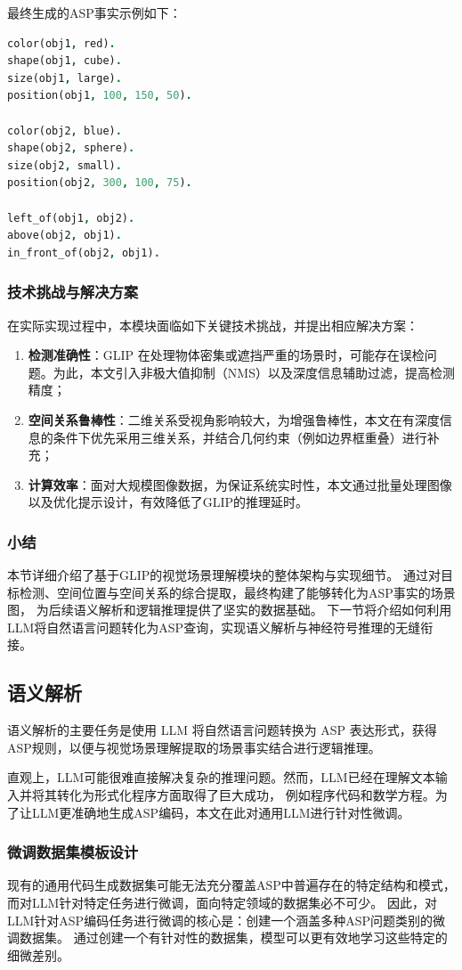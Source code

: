最终生成的ASP事实示例如下： 
\begin{lstlisting}[language=Prolog] 
color(obj1, red). 
shape(obj1, cube). 
size(obj1, large). 
position(obj1, 100, 150, 50).

color(obj2, blue). 
shape(obj2, sphere). 
size(obj2, small). 
position(obj2, 300, 100, 75).

left_of(obj1, obj2). 
above(obj2, obj1). 
in_front_of(obj2, obj1). 
\end{lstlisting}
\subsubsection{技术挑战与解决方案}
在实际实现过程中，本模块面临如下关键技术挑战，并提出相应解决方案： 
\begin{enumerate}[label=(\arabic*),itemsep=0.5em] 
    \item \textbf{检测准确性}：GLIP 在处理物体密集或遮挡严重的场景时，可能存在误检问题。为此，本文引入非极大值抑制（NMS）以及深度信息辅助过滤，提高检测精度； 
    \item \textbf{空间关系鲁棒性}：二维关系受视角影响较大，为增强鲁棒性，本文在有深度信息的条件下优先采用三维关系，并结合几何约束（例如边界框重叠）进行补充； 
    \item \textbf{计算效率}：面对大规模图像数据，为保证系统实时性，本文通过批量处理图像以及优化提示设计，有效降低了GLIP的推理延时。
\end{enumerate}
\subsubsection{小结}
本节详细介绍了基于GLIP的视觉场景理解模块的整体架构与实现细节。
通过对目标检测、空间位置与空间关系的综合提取，最终构建了能够转化为ASP事实的场景图，
为后续语义解析和逻辑推理提供了坚实的数据基础。
下一节将介绍如何利用LLM将自然语言问题转化为ASP查询，实现语义解析与神经符号推理的无缝衔接。
\subsection{语义解析}
语义解析的主要任务是使用 LLM 将自然语言问题转换为 ASP 表达形式，获得ASP规则，以便与视觉场景理解提取的场景事实结合进行逻辑推理。

直观上，LLM可能很难直接解决复杂的推理问题。然而，LLM已经在理解文本输入并将其转化为形式化程序方面取得了巨大成功，
例如程序代码\cite{gao2023pal}和数学方程\cite{he2023solving}。为了让LLM更准确地生成ASP编码，本文在此对通用LLM进行针对性微调。
\subsubsection{微调数据集模板设计}
现有的通用代码生成数据集可能无法充分覆盖ASP中普遍存在的特定结构和模式，而对LLM针对特定任务进行微调，面向特定领域的数据集必不可少。
因此，对LLM针对ASP编码任务进行微调的核心是：创建一个涵盖多种ASP问题类别的微调数据集。
通过创建一个有针对性的数据集，模型可以更有效地学习这些特定的细微差别。

